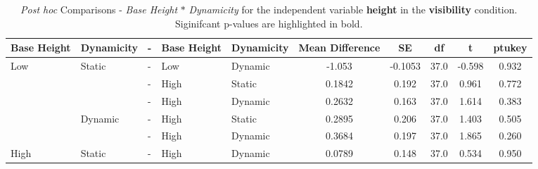 \begin{table*}[ht]
    \centering
    \caption{\textit{Post hoc} Comparisons - \textit{Base Height} $\ast$ \textit{Dynamicity} for the independent variable \textbf{height} in the \textbf{visibility} condition. Siginifcant p-values are highlighted in bold.}
    \begin{tabular}{lllll|ccccc}
    \toprule
    \textbf{Base Height} & \textbf{Dynamicity} & -  & \textbf{Base Height} & \textbf{Dynamicity} & \textbf{Mean Difference} & \textbf{SE} & \textbf{df} & \textbf{t} & \textbf{ptukey} \\
    \midrule
    Low            & Static           & - & Low            & Dynamic          & -1.053                   & -0.1053       & 37.0        & -0.598     & 0.932           \\
                   &                  & - & High            & Static           & 0.1842                   & 0.192       & 37.0        & 0.961     & 0.772                      \\
                   &                  & - & High            & Dynamic          & 0.2632                   & 0.163       & 37.0        & 1.614     & 0.383                      \\
                   & Dynamic          & - & High            & Static           & 0.2895                   & 0.206       & 37.0        & 1.403     & 0.505                      \\
                   &                  & - & High            & Dynamic          & 0.3684                   & 0.197       & 37.0        & 1.865     & 0.260                      \\
    High            & Static           & - & High            & Dynamic          & 0.0789                   & 0.148       & 37.0        & 0.534     & 0.950             \\
    \bottomrule                           
    \end{tabular}
\end{table*}

